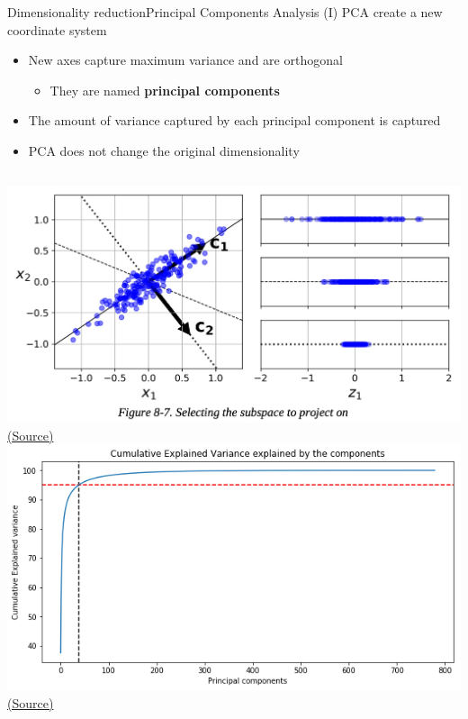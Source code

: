 \documentclass[10pt,compress]{beamer} %
\begin{document}
\begin{frame}{Dimensionality reduction}{Principal Components Analysis (I)}
	PCA create a new coordinate system
    \begin{itemize}
        \item New axes capture maximum variance and are orthogonal
            \begin{itemize}
            \item They are named \textbf{principal components}
            \end{itemize}
        \item The amount of variance captured by each principal component is captured
        \item PCA does not change the original dimensionality
    \end{itemize}

    \begin{columns}
			\includegraphics[width=\linewidth]{figs/2d_variance_projection.png}
    		\centering \tiny{\href{https://github.com/Akramz/Hands-on-Machine-Learning-with-Scikit-Learn-Keras-and-TensorFlow/blob/master/08.Dim_Reduction.ipynb}{(Source)}}
	        \includegraphics[width=\linewidth]{figs/pcavariance.png}
    		\centering \tiny{\href{https://www.kaggle.com/code/mirzarahim/introduction-to-pca-image-compression-example}{(Source)}}
    \end{columns}
\end{frame}
\end{document}
